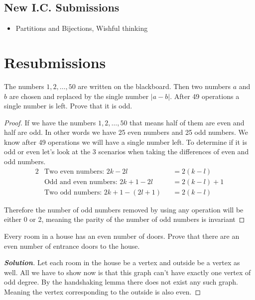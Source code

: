\documentclass[11pt]{article}
\newenvironment{problem}[2][Problem\!]{\begin{trivlist}
\item[\hskip \labelsep {\bfseries #1}\hskip \labelsep {\bfseries #2}]}{\end{trivlist}}
\newenvironment{solution}{\begin{proof}[\textbf{\textit{Solution}}] }{\end{proof}}
\newcommand{\abs}[1]{\left\lvert#1\right\rvert} %
\begin{document}
\subsection{New I.C. Submissions}
\begin{itemize}
    \item[124] Partitions and Bijections, Wishful thinking
\end{itemize}

\section{Resubmissions}
\begin{tcolorbox}
    \begin{problem}{10/11 IC (44.)} 
        The numbers $1,2,\dots, 50$ are written on the blackboard. Then two numbers $a$ and $b$ are chosen and replaced by the single number $\abs{a-b}$. After 49 operations a single number is left. Prove that it is odd. 
    \end{problem}
\end{tcolorbox}

\begin{proof}
    If we have the numbers $1,2,\dots, 50$ that means half of them are even and half are odd. In other words we have 25 even numbers and 25 odd numbers. We know after 49 operations we will have a single number left. To determine if it is odd or even let's look at the 3 scenarios when taking the differences of even and odd numbers.
    \begin{alignat*}{2}
        &\text{Two even numbers: } 2k - 2l &&= 2(k-l) \\
        &\text{Odd and even numbers: } 2k + 1 - 2l &&= 2(k-l) + 1 \\
        &\text{Two odd numbers: } 2k + 1 - (2l + 1) &&= 2(k-l)
    \end{alignat*}

    Therefore the number of odd numbers removed by using any operation will be either 0 or 2, meaning the parity of the number of odd numbers is invariant
\end{proof}
\newpage
\begin{tcolorbox}
    \begin{problem}{10/13 IC (50.)} 
        Every room in a house has an even number of doors. Prove that there are an even number of entrance doors to the house. 
    \end{problem}
\end{tcolorbox}
\begin{solution}
    Let each room in the house be a vertex and outside be a vertex as well. All we have to show now is that this graph can't have exactly one vertex of odd degree. By the handshaking lemma there does not exist any such graph. Meaning the vertex corresponding to the outside is also even. 
\end{solution}
\end{document}
